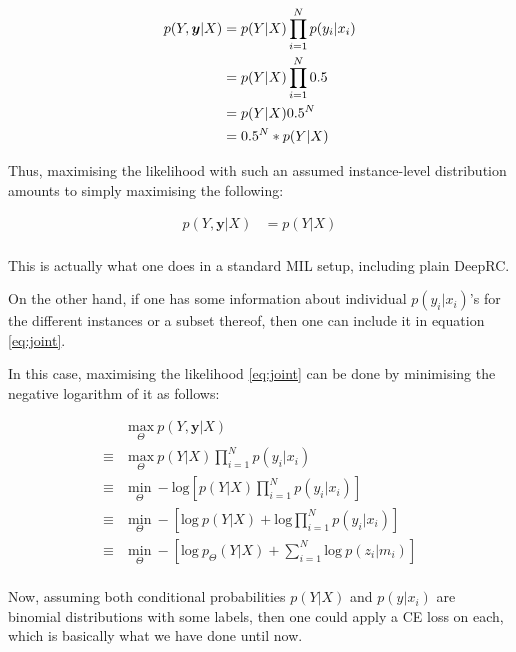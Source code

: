 \documentclass[11pt]{article}
\begin{document}
    \begin{align}
        p(Y,\bm{y}\vert X) &= p(Y\vert X)\prod_{i=1}^{N} p(y_i\vert x_i) \label{eq:joint} \\
        &= p(Y\vert X)\prod_{i=1}^{N} 0.5 \notag \\
        &= p(Y\vert X)0.5^N \notag \\
        &= 0.5^N * p(Y\vert X) \notag
    \end{align}

    Thus, maximising the likelihood with such an assumed instance-level distribution amounts to simply maximising the following:

    \begin{align*}
        p(Y,\bm{y}\vert X) &= p(Y\vert X)\\
    \end{align*}

    This is actually what one does in a standard MIL setup, including plain DeepRC.
    \newpage

    On the other hand, if one has some information about individual $p(y_i|x_i)$'s for the different instances or a subset thereof, then one can include it in equation \ref{eq:joint}.

    In this case, maximising the likelihood \ref{eq:joint} can be done by minimising the negative logarithm of it as follows:


    \begin{align*}
        &\underset{\Theta}{\text{max}}\ p(Y,\bm{y}\vert X) \\
        \equiv\ &\underset{\Theta}{\text{max}}\ p(Y\vert X)\prod_{i=1}^{N} p(y_i\vert x_i) \\
        \equiv\ &\underset{\Theta}{\text{min}}\ - \text{log} [p(Y\vert X)\prod_{i=1}^{N} p(y_i\vert x_i)]\\
        \equiv\ &\underset{\Theta}{\text{min}}\ - \left[\text{log}\ p(Y\vert X) + \text{log}\prod_{i=1}^{N} p(y_i\vert x_i)\right]\\
        \equiv\ &\underset{\Theta}{\text{min}}\ - \left[\text{log}\ p_\Theta(Y\vert X) + \sum_{i=1}^{N} \text{log}\ p(z_i\vert m_i)\right]\\
    \end{align*}

    Now, assuming both conditional probabilities $p(Y\vert X)$ and $p(y\vert x_i)$ are binomial distributions with some labels, then one could apply a CE loss on each, which is basically what we have done until now.
\end{document}
